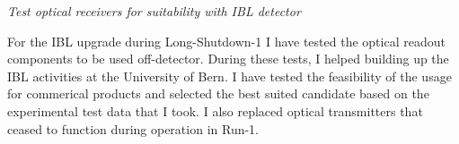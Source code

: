 \documentclass[]{cv} %
\begin{document}
\begin{resume}
\vspace{15pt}
\Large{}
\textit{Test optical receivers for suitability with IBL detector} \\
\normalsize{}

For the IBL upgrade during Long-Shutdown-1 I have tested the optical readout
components to be used off-detector. During these tests, I helped building up the
IBL activities at the University of Bern. I have tested the feasibility of the
usage for commerical products and selected the best suited candidate based on
the experimental test data that I took. I also replaced optical transmitters
that ceased to function during operation in Run-1.

\end{resume}
\fi
\end{document}
